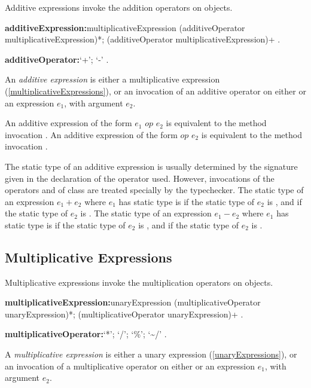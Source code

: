 \documentclass{article}
\begin{document}
\LMHash{}
Additive expressions invoke the addition operators on objects.

\begin{grammar}
{\bf additiveExpression:}multiplicativeExpression
  \gnewline{} (additiveOperator multiplicativeExpression)*;
  \SUPER{} (additiveOperator multiplicativeExpression)+
  .

{\bf additiveOperator:}`+';
  `-'
  .
\end{grammar}

\LMHash{}
An {\em additive expression} is either a multiplicative expression (\ref{multiplicativeExpressions}), or an invocation of an additive operator on either \SUPER{} or an expression $e_1$, with argument $e_2$.

\LMHash{}
An additive expression of the form $e_1$ $op$ $e_2$ is equivalent to the method invocation .
An additive expression of the form \SUPER{} $op$ $e_2$ is equivalent to the method invocation .

\LMHash{}
The static type of an additive expression is usually determined by the signature given in the declaration of the operator used.
However, invocations of the operators \code{+} and \code{-} of class  are treated specially by the typechecker.
The static type of an expression $e_1 + e_2$ where $e_1$ has static type  is  if the static type of $e_2$ is , and  if the static type of $e_2$ is .
The static type of an expression $e_1 - e_2$ where $e_1$ has static type  is  if the static type of $e_2$ is , and  if the static type of $e_2$ is .


\subsection{Multiplicative Expressions}

\LMHash{}
Multiplicative expressions invoke the multiplication operators on objects.

\begin{grammar}
{\bf multiplicativeExpression:}unaryExpression (multiplicativeOperator unaryExpression)*;
  \SUPER{} (multiplicativeOperator unaryExpression)+
  .

{\bf multiplicativeOperator:}`*';
  `/';
  `\%';
  `\~{}/'
  .
\end{grammar}

\LMHash{}
 A {\em multiplicative expression} is either a unary expression (\ref{unaryExpressions}), or an invocation of a multiplicative operator on either \SUPER{} or an expression $e_1$, with argument $e_2$.
\end{document}
